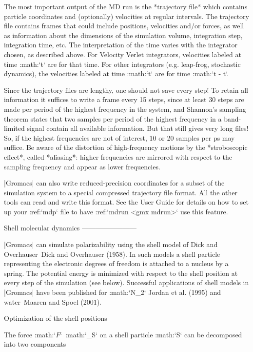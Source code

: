 {The most important output of the MD run is the *trajectory
file* 
which contains particle coordinates and (optionally) velocities at
regular intervals. The trajectory file contains frames that could
include positions, velocities and/or forces, as well as information
about the dimensions of the simulation volume, integration step,
integration time, etc. The interpretation of the time varies with the
integrator chosen, as described above. For Velocity Verlet integrators,
velocities labeled at time :math:`t` are for that time. For other
integrators (e.g. leap-frog, stochastic dynamics), the velocities
labeled at time :math:`t` are for time
:math:`t - {{}{{\Delta t}}}`.

Since the trajectory files are lengthy, one should not save every step!
To retain all information it suffices to write a frame every 15 steps,
since at least 30 steps are made per period of the highest frequency in
the system, and Shannon’s sampling
theorem
states that two samples per period of the highest frequency in a
band-limited signal contain all available information. But that still
gives very long files! So, if the highest frequencies are not of
interest, 10 or 20 samples per ps may suffice. Be aware of the
distortion of high-frequency motions by the *stroboscopic effect*,
called *aliasing*: higher frequencies are mirrored with respect to the
sampling frequency and appear as lower frequencies.

|Gromacs| can also write reduced-precision coordinates for a subset of the
simulation system to a special compressed trajectory file format. All
the other tools can read and write this format. See the User Guide for
details on how to set up your :ref:`mdp` file to have
:ref:`mdrun <gmx mdrun>` use this feature.

Shell molecular dynamics
------------------------

|Gromacs| can simulate polarizability
using the shell model
of Dick and
Overhauser Dick and Overhauser (1958). In such models a shell particle
representing the electronic degrees of freedom is attached to a nucleus
by a spring. The potential energy is minimized with respect to the shell
position at every step of the simulation (see below). Successful
applications of shell models in |Gromacs| have been published for
:math:`N_2` Jordan et al. (1995) and water Maaren and Spoel (2001).

Optimization of the shell positions
~~~~~~~~~~~~~~~~~~~~~~~~~~~~~~~~~~~

The force 
:math:`{\mbox{\boldmath ${F}$}}`\ :math:`_S` on a shell
particle :math:`S` can be decomposed into two components

}
